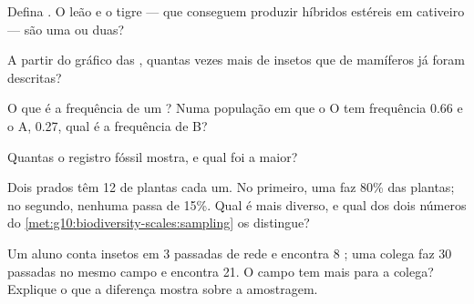 \begin{exercise}[$\star$]\label{exo:g10:biodiversity-scales:2}
Defina . O leão e o tigre --- que conseguem produzir híbridos
estéreis em cativeiro --- são uma  ou duas?
\end{exercise}

\begin{exercise}[$\star$]\label{exo:g10:biodiversity-scales:3}
A partir do gráfico das , quantas vezes mais  de
insetos que de mamíferos já foram descritas?
\end{exercise}

\begin{exercise}[$\star$]\label{exo:g10:biodiversity-scales:4}
O que é a frequência de um ? Numa população em que o  O tem
frequência 0.66 e o  A, 0.27, qual é a frequência de B?
\end{exercise}

\begin{exercise}[$\star$]\label{exo:g10:biodiversity-scales:5}
Quantas  o registro fóssil mostra, e qual foi a maior?
\end{exercise}

\begin{exercise}[$\star\star$]\label{exo:g10:biodiversity-scales:6}
Dois prados têm 12  de plantas cada um. No primeiro, uma
 faz 80\% das plantas; no segundo, nenhuma  passa de
15\%. Qual é mais diverso, e qual dos dois números do
\cref{met:g10:biodiversity-scales:sampling} os distingue?
\end{exercise}

\begin{exercise}[$\star\star$]\label{exo:g10:biodiversity-scales:7}
Um aluno conta insetos em 3 passadas de rede e encontra 8 ; uma
colega faz 30 passadas no mesmo campo e encontra 21. O campo tem mais
 para a colega? Explique o que a diferença mostra sobre a
amostragem.
\end{exercise}

